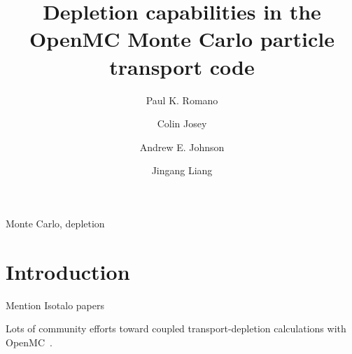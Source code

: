 \documentclass[3p,authoryear]{elsarticle}
\begin{document}
\title{Depletion capabilities in the OpenMC Monte Carlo particle transport code}

\author[anl]{Paul K. Romano}

\author[lanl]{Colin Josey}

\author[gatech]{Andrew E. Johnson}

\author[tsinghua]{Jingang Liang}

\address[anl]{Argonne National Laboratory, 9700 S. Cass Ave, Lemont, IL 60439, United States}
\address[lanl]{Los Alamos National Laboratory, PO Box 1663, Los Alamos, NM 87545, United States}
\address[gatech]{Georgia Institute of Technology, 770 State St NW, Atlanta, GA 30318, United States}
\address[tsinghua]{Institute of Nuclear and New Energy Technology, Tsinghua University, Beijing, China}

\begin{abstract}

\end{abstract}

\begin{keyword}
  Monte Carlo, depletion
\end{keyword}

\maketitle

\section{Introduction}

Mention Isotalo papers

Lots of community efforts toward coupled transport-depletion calculations with
OpenMC~\citep{gul2017ane,lanversin2017icone,lanversin2019phd,liu2019nst,zhuang2020pne,zhao2020ned,zhang2020ane}.
\end{document}
